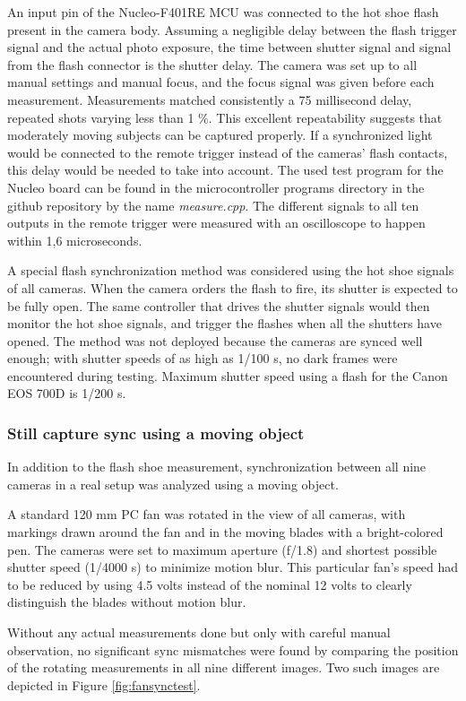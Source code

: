 An input pin of the Nucleo-F401RE MCU was connected to the hot shoe flash present in the camera body.
Assuming a negligible delay between the flash trigger signal and the actual photo exposure, the time between shutter signal and signal from the flash connector is the shutter delay.
The camera was set up to all manual settings and manual focus, and the focus signal was given before each measurement.
Measurements matched consistently a 75 millisecond delay, repeated shots varying less than 1 \%.
This excellent repeatability suggests that moderately moving subjects can be captured properly.
If a synchronized light would be connected to the remote trigger instead of the cameras' flash contacts, this delay would be needed to take into account.
The used test program for the Nucleo board can be found in the microcontroller programs directory in the github repository by the name \emph{measure.cpp}.
The different signals to all ten outputs in the remote trigger were measured with an oscilloscope to happen within 1,6 microseconds.

A special flash synchronization method was considered using the hot shoe signals of all cameras.
When the camera orders the flash to fire, its shutter is expected to be fully open.
The same controller that drives the shutter signals would then monitor the hot shoe signals, and trigger the flashes when all the shutters have opened.
The method was not deployed because the cameras are synced well enough; with shutter speeds of as high as 1/100 s, no dark frames were encountered during testing.
Maximum shutter speed using a flash for the Canon EOS 700D is 1/200 s.

\subsubsection{Still capture sync using a moving object}

In addition to the flash shoe measurement, synchronization between all nine cameras in a real setup was analyzed using a moving object.

A standard 120 mm PC fan was rotated in the view of all cameras, with markings drawn around the fan and in the moving blades with a bright-colored pen.
The cameras were set to maximum aperture (f/1.8) and shortest possible shutter speed (1/4000 s) to minimize motion blur.
This particular fan's speed had to be reduced by using 4.5 volts instead of the nominal 12 volts to clearly distinguish the blades without motion blur.

Without any actual measurements done but only with careful manual observation, no significant sync mismatches were found by comparing the position of the rotating measurements in all nine different images.
Two such images are depicted in Figure \ref{fig:fansynctest}.

